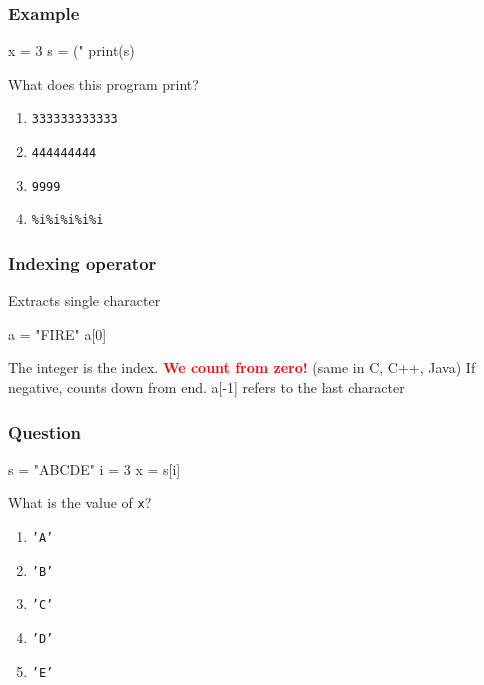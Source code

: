 \documentclass[11pt]{beamer}
\begin{document}
\begin{frame}[fragile]
  \frametitle{Example}
  \Enlarge

  \begin{semiverbatim}
x = 3
s = ("%
print(s)
  \end{semiverbatim}

  What does this program print?
  \begin{enumerate}[label=\Alph*]
  \item  \texttt{333333333333}
  \item  \texttt{444444444}
  \item  \texttt{9999}
  \item  \texttt{\%i\%i\%i\%i\%i}
  \end{enumerate}
\end{frame}

\begin{frame}[fragile]
  \frametitle{Indexing operator}
  \Enlarge

  \begin{itemize}
  \myitem  Extracts single character \pause
\begin{semiverbatim}
a = "FIRE"
a[0]
\end{semiverbatim} \pause
  \myitem  The integer is the index. \pause
  \myitem  \textcolor{red}{\bf We count from zero!} (same in C, C++, Java) \pause
  \myitem  If negative, counts down from end.
  \myitem a[-1] refers to the last character
  \end{itemize}
\end{frame}

\begin{frame}[fragile]
  \frametitle{Question}
  \Enlarge

  \begin{semiverbatim}
s = "ABCDE"
i = 3
x = s[i]
  \end{semiverbatim}

  What is the value of \texttt{x}?
  \begin{enumerate}[label=\Alph*]
  \item  \texttt{'A'}
  \item  \texttt{'B'}
  \item  \texttt{'C'}
  \item  \texttt{'D'}
  \item  \texttt{'E'}
  \end{enumerate}
\end{frame}
\end{document}
